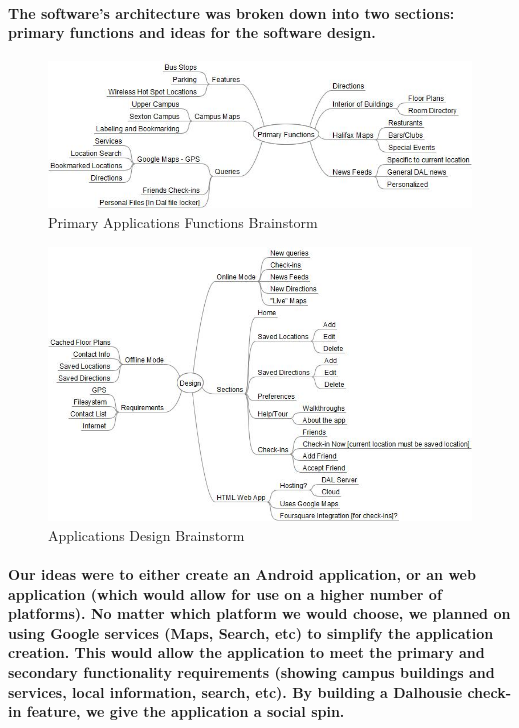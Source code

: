 \documentclass{report}
\begin{document}
    \paragraph{The software's architecture was broken down into two sections:
    primary functions and ideas for the software design.}
    \begin{figure}
        \centering
            \includegraphics[width=\textwidth]{img/figure413.jpg}
        \caption{Primary Applications Functions Brainstorm}
    \end{figure}
    \begin{figure}
        \centering
            \includegraphics[width=\textwidth]{img/figure414.jpg}
        \caption{Applications Design Brainstorm}
    \end{figure}
    \paragraph{Our ideas were to either create an Android application, or an web
    application (which would allow for use on a higher number of platforms). No
    matter which platform we would choose, we planned on using Google services
    (Maps, Search, etc) to simplify the application creation. This would allow the
    application to meet the primary and secondary functionality requirements
    (showing campus buildings and services, local information, search, etc). By
    building a Dalhousie check-in feature, we give the application a social spin.}
\end{document}
